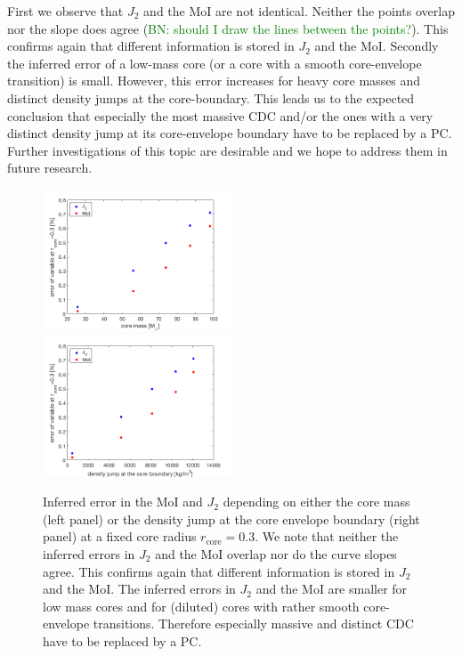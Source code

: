 \documentclass[usenatbib]{mnras}
\newcommand\bncomment[1]{\textcolor{green}{BN: #1}}
\newcommand{\sub}[1]{_{\text{#1}}}
\begin{document}
First we observe that $J_2$ and the MoI are not identical. Neither the points overlap nor the slope does agree (\bncomment{should I draw the lines between the points?}). This confirms again that different information is stored in $J_2$ and the MoI. 
Secondly the inferred error of a low-mass core (or a core with a smooth core-envelope transition) is small. However, this error increases for heavy core masses and distinct density jumps at the core-boundary. This leads us to the expected conclusion that especially the most massive CDC and/or the ones with a very distinct density jump at its core-envelope boundary have to be replaced by a PC. Further investigations of this topic are desirable and we hope to address them in future research. 

\begin{figure}
    \centering
    \includegraphics[width = 0.5\textwidth]{Figures/error_vs_mcore_only_J2_MoI.png}%
    \includegraphics[width = 0.5\textwidth]{Figures/error_vs_densityjump_only_J2_MoI.png}
    \caption{Inferred error in the MoI and $J_2$ depending on either the core mass (left panel) or the density jump at the core envelope boundary (right panel) at a fixed core radius $r\sub{core}=0.3$. We note that neither the inferred errors in $J_2$ and the MoI overlap nor do the curve slopes agree. This confirms again that different information is stored in  $J_2$ and the MoI. The inferred errors in $J_2$ and the MoI are smaller for low mass cores and for (diluted) cores with rather smooth core-envelope transitions. Therefore especially massive and distinct CDC have to be replaced by a PC.}
    \label{fig:error_vs_mcore}
\end{figure}
\end{document}
